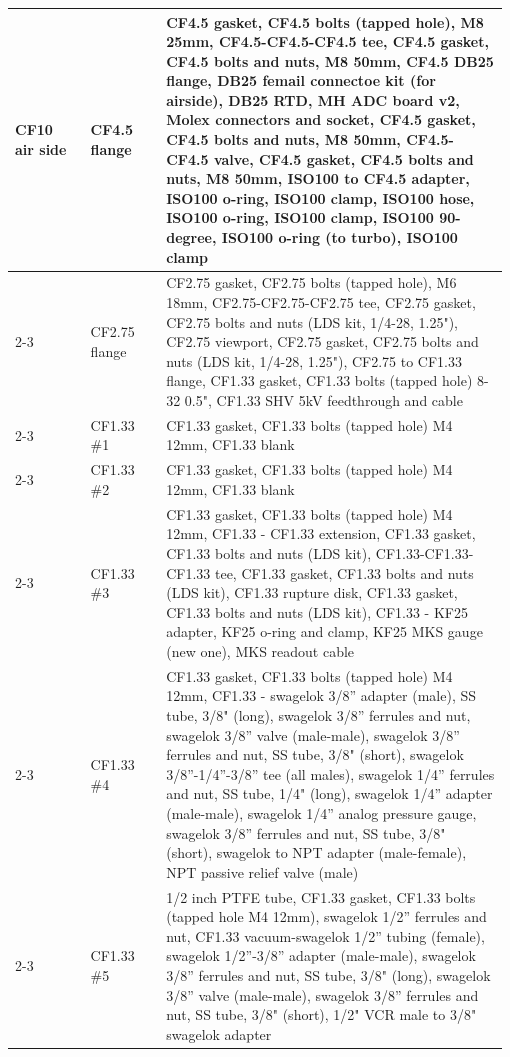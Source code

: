 \begin{longtable}{|p{0.15\linewidth}|p{0.15\linewidth}|p{0.68\linewidth}|}
\multirow{10}{*}{CF10 air side} & CF4.5 flange & CF4.5 gasket, CF4.5 bolts (tapped hole), M8 25mm, CF4.5-CF4.5-CF4.5 tee, CF4.5 gasket, CF4.5 bolts and nuts, M8 50mm, CF4.5 DB25 flange, DB25 femail connectoe kit (for airside), DB25 RTD, MH ADC board v2, Molex connectors and socket, CF4.5 gasket, CF4.5 bolts and nuts, M8 50mm, CF4.5-CF4.5 valve, CF4.5 gasket, CF4.5 bolts and nuts, M8 50mm, ISO100 to CF4.5 adapter, ISO100 o-ring, ISO100 clamp, ISO100 hose, ISO100 o-ring, ISO100 clamp, ISO100 90-degree, ISO100 o-ring (to turbo), ISO100 clamp \\ 
\cline{2-3}
 & CF2.75 flange & CF2.75 gasket, CF2.75 bolts (tapped hole), M6 18mm, CF2.75-CF2.75-CF2.75 tee, CF2.75 gasket, CF2.75 bolts and nuts (LDS kit, 1/4-28, 1.25"), CF2.75 viewport, CF2.75 gasket, CF2.75 bolts and nuts (LDS kit, 1/4-28, 1.25"), CF2.75 to CF1.33 flange, CF1.33 gasket, CF1.33 bolts (tapped hole) 8-32 0.5", CF1.33 SHV 5kV feedthrough and cable \\ 
\cline{2-3}
 & CF1.33 \#1 & CF1.33 gasket, CF1.33 bolts (tapped hole) M4 12mm, CF1.33 blank \\ 
\cline{2-3}
 & CF1.33 \#2 & CF1.33 gasket, CF1.33 bolts (tapped hole) M4 12mm, CF1.33 blank \\ 
\cline{2-3}
 & CF1.33 \#3 & CF1.33 gasket, CF1.33 bolts (tapped hole) M4 12mm, CF1.33 - CF1.33 extension, CF1.33 gasket, CF1.33 bolts and nuts (LDS kit), CF1.33-CF1.33-CF1.33 tee, CF1.33 gasket, CF1.33 bolts and nuts (LDS kit), CF1.33 rupture disk, CF1.33 gasket, CF1.33 bolts and nuts (LDS kit), CF1.33 - KF25 adapter, KF25 o-ring and clamp, KF25 MKS gauge (new one), MKS readout cable \\ 
\cline{2-3}
 & CF1.33 \#4 & CF1.33 gasket, CF1.33 bolts (tapped hole) M4 12mm, CF1.33 - swagelok 3/8'' adapter (male), SS tube, 3/8" (long), swagelok 3/8'' ferrules and nut, swagelok 3/8'' valve (male-male), swagelok 3/8'' ferrules and nut, SS tube, 3/8" (short), swagelok 3/8''-1/4''-3/8'' tee (all males), swagelok 1/4'' ferrules and nut, SS tube, 1/4" (long), swagelok 1/4'' adapter (male-male), swagelok 1/4'' analog pressure gauge, swagelok 3/8'' ferrules and nut, SS tube, 3/8" (short), swagelok to NPT adapter (male-female), NPT passive relief valve (male) \\
\cline{2-3}
 & CF1.33 \#5 & 1/2 inch PTFE tube, CF1.33 gasket, CF1.33 bolts (tapped hole M4 12mm), swagelok 1/2'' ferrules and nut, CF1.33 vacuum-swagelok 1/2'' tubing (female), swagelok 1/2''-3/8'' adapter (male-male), swagelok 3/8'' ferrules and nut, SS tube, 3/8" (long), swagelok 3/8'' valve (male-male), swagelok 3/8'' ferrules and nut, SS tube, 3/8" (short), 1/2" VCR male to 3/8" swagelok adapter \\

\end{longtable}
